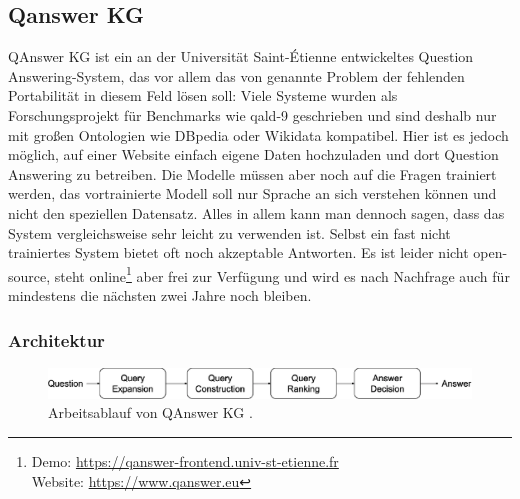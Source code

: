 \subsection{Qanswer KG}

QAnswer KG \citep{qanswer} ist ein an der Universität Saint-Étienne entwickeltes Question Answering-System,
das vor allem das von \citet{diefenbachkbqa} genannte Problem der fehlenden Portabilität in diesem Feld lösen soll:
Viele Systeme wurden als Forschungsprojekt für Benchmarks wie \ac{qald}-9 geschrieben und sind deshalb nur mit großen Ontologien wie DBpedia oder Wikidata kompatibel.
Hier ist es jedoch möglich, auf einer Website einfach eigene Daten hochzuladen und dort Question Answering zu betreiben.
Die Modelle müssen aber noch auf die Fragen trainiert werden, das vortrainierte Modell soll nur Sprache an sich verstehen können und nicht den speziellen Datensatz.
Alles in allem kann man dennoch sagen, dass das System vergleichsweise sehr leicht zu verwenden ist.
Selbst ein fast nicht trainiertes System bietet oft noch akzeptable Antworten.
Es ist leider nicht open-source, steht online\footnote{Demo: \url{https://qanswer-frontend.univ-st-etienne.fr}\\Website: \url{https://www.qanswer.eu}} aber frei zur Verfügung und wird es nach Nachfrage auch für mindestens die nächsten zwei Jahre noch bleiben.

\subsubsection{Architektur}

\begin{figure}%
\centering
\includegraphics[width=\textwidth, height=\textheight, keepaspectratio]{Images/QAnswerWorkflow.png}
\caption[QAnswer KG Arbeitsablauf]{Arbeitsablauf von QAnswer KG \citep{qanswer}.}
\label{fig:qanswerworkflow}
\end{figure}

